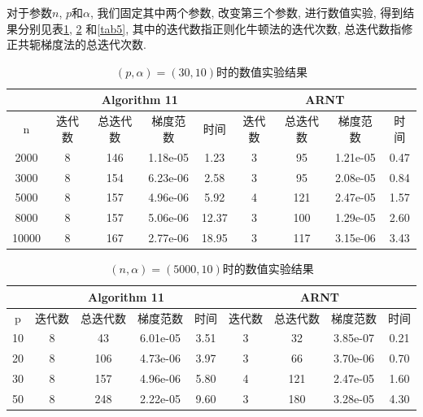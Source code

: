 \documentclass[UTF8]{ctexart}
\begin{document}
对于参数$n$, $p$和$\alpha$, 我们固定其中两个参数, 改变第三个参数, 进行数值实验, 得到结果分别见表\ref{tab3}, \ref{tab4} 和\ref{tab5}, 其中的迭代数指正则化牛顿法的迭代次数, 总迭代数指修正共轭梯度法的总迭代次数.  

\begin{table}[htb]
    \centering
    \begin{tabular}{|c|cccc|cccc|}
        \hline
         & \multicolumn{4}{|c|}{Algorithm 11} & \multicolumn{4}{|c|}{ARNT}\\
        \hline
        n & 迭代数 & 总迭代数 & 梯度范数 & 时间 & 迭代数 & 总迭代数 & 梯度范数 & 时间\\
        \hline
        2000 & 8 & 146 & 1.18e-05 & 1.23 & 3 & 95 & 1.21e-05 & 0.47 \\
        \hline
        3000 & 8 & 154 & 6.23e-06 & 2.58 & 3 & 95 & 2.08e-05 & 0.84 \\
        \hline 
        5000 & 8 & 157 & 4.96e-06 & 5.92 & 4 & 121 & 2.47e-05 & 1.57 \\
        \hline
        8000 & 8 & 157 & 5.06e-06 & 12.37 & 3 & 100 & 1.29e-05 & 2.60 \\
        \hline 
        10000 & 8 & 167 & 2.77e-06 & 18.95 & 3 & 117 & 3.15e-06 & 3.43 \\
        \hline
    \end{tabular}
    \caption{$(p,\alpha)=(30,10)$时的数值实验结果}\label{tab3}
\end{table}

\begin{table}[htb]
    \centering
    \begin{tabular}{|c|cccc|cccc|}
        \hline
         & \multicolumn{4}{|c|}{Algorithm 11} & \multicolumn{4}{|c|}{ARNT}\\
        \hline
        p & 迭代数 & 总迭代数 & 梯度范数 & 时间 & 迭代数 & 总迭代数 & 梯度范数 & 时间\\
        \hline
        10 & 8 & 43 & 6.01e-05 & 3.51 & 3 & 32 & 3.85e-07 & 0.21 \\
        \hline
        20 & 8 & 106 & 4.73e-06 & 3.97 & 3 & 66 & 3.70e-06 & 0.70 \\
        \hline 
        30 & 8 & 157 & 4.96e-06 & 5.80 & 4 & 121 & 2.47e-05 & 1.60 \\
        \hline
        50 & 8 & 248 & 2.22e-05 & 9.60 & 3 & 180 & 3.28e-05 & 4.30 \\
        \hline 
    \end{tabular}
    \caption{$(n,\alpha)=(5000,10)$时的数值实验结果}\label{tab4}
\end{table}
\end{document}
